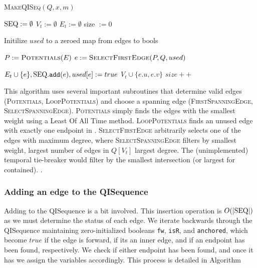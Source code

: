 \begin{algorithm}
  \label{alg:qi_seq}
  \caption{\textsc{MakeQISeq}$(Q,x,m)$}
  \SetAlgoLined


  ${\text{SEQ}} := \emptyset$\;
  $V_t := \emptyset$\;
  $E_t := \emptyset$\;
  size $:= 0$\;

  Initilize $used$ to a zeroed map from edges to bools\;

  $P := \textsc{Potentials}(E)$ \;
  $e := \textsc{SelectFirstEdge}(P, Q, used)$\;

  $E_t \cup \{e\}, {\text{SEQ}}.\texttt{add}(e), used[e] := true$\;
  $V_t \cup \{e.u,e.v\}$\;
  $size++$\;

  \Return \seq\;

\end{algorithm}

This algorithm uses several important subroutines that determine valid edges
(\textsc{Potentials}, \textsc{LoopPotentials}) and choose a spanning edge
(\textsc{FirstSpanningEdge}, \textsc{SelectSpanningEdge}). \textsc{Potentials}
simply finds the edges with the smallest weight using a Least Of All Time method.
\textsc{LoopPotentials} finds an unused edge with exactly one endpoint in \seq.
\textsc{SelectFirstEdge} arbitrarily selects one of the edges with maximum
degree, where \textsc{SelectSpanningEdge} filters by smallest weight, largest
number of edges in $Q[V_t]$ largest degree.  The (unimplemented) temporal
tie-breaker would filter by the smallest intersection (or largest for contained).
.

\subsubsection{Adding an edge to the QISequence}
Adding to the QISequence is a bit involved. This insertion operation is
$O(|{\text{SEQ}}|)$ as we must determine the status of each edge.  We iterate backwards
through the QISequence maintaining zero-initialized booleans \texttt{fw},
\texttt{isR}, and \texttt{anchored}, which become $true$ if the edge is forward,
if its an inner edge, and if an endpoint has been found, respectively. We check
if either endpoint has been found, and once it has we assign the variables
accordingly. This process is detailed in Algorithm~\cite{alg:add}

